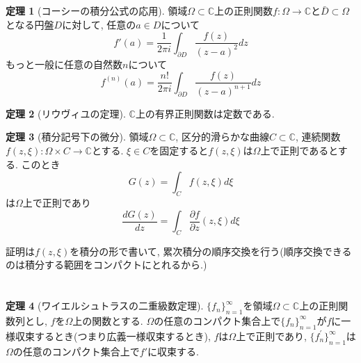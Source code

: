 \documentclass[dvipdfmx,a4paper,11pt]{article}
\newcommand{\C}{\mathbb{C}}
\theoremstyle{definition}
\newtheorem{thm}{定理}
\newcommand{\pdrv}[2]{\frac{\partial #1}{\partial #2}}
\newcommand{\drv}[2]{\frac{d #1}{d#2}}
\begin{document}
    \section{}

         \begin{tcolorbox}[
    colback = white,
    colframe = green!35!black,
    fonttitle = \bfseries,
    breakable = true]
    \begin{thm}[コーシーの積分公式の応用]
領域$\Omega \subset \C$上の正則関数$f : \Omega \rightarrow \C$と$\bar{D} \subset \Omega$となる円盤$D$に対して, 任意の$a \in D$について
$$
f'(a) = \frac{1}{2 \pi i} \int_{\partial D} \frac{f(z)}{(z - a)^2} dz
$$
もっと一般に任意の自然数$n$について
$$
f^{(n)}(a) = \frac{n !}{2 \pi i} \int_{\partial D} \frac{f(z)}{(z - a)^{n+1}} dz
$$
    \end{thm}
    \end{tcolorbox}
    
          \begin{tcolorbox}[
    colback = white,
    colframe = green!35!black,
    fonttitle = \bfseries,
    breakable = true]
    \begin{thm}[リウヴィユの定理]
$\C$上の有界正則関数は定数である. 
    \end{thm}
    \end{tcolorbox}

          \begin{tcolorbox}[
    colback = white,
    colframe = green!35!black,
    fonttitle = \bfseries,
    breakable = true]
    \begin{thm}[積分記号下の微分]
    領域$\Omega \subset \C$, 区分的滑らかな曲線$C\subset \C$, 
連続関数$f (z, \xi): \Omega \times C \rightarrow \C$とする.
$\xi \in C$を固定すると$f(z, \xi)$は$\Omega$上で正則であるとする.
このとき
$$
G(z) =  \int_{C} f(z, \xi)d\xi
$$
は$\Omega$上で正則であり
$$
\drv{G(z)}{z}= \int_{C} \pdrv{f}{z}(z, \xi)d\xi
$$
    \end{thm}
    \end{tcolorbox}
証明は$f(z,\xi)$を積分の形で書いて, 累次積分の順序交換を行う(順序交換できるのは積分する範囲をコンパクトにとれるから.)

\section{}

          \begin{tcolorbox}[
    colback = white,
    colframe = green!35!black,
    fonttitle = \bfseries,
    breakable = true]
    \begin{thm}[ワイエルシュトラスの二重級数定理]
$\{ f_{n}\}_{n=1}^{\infty}$を領域$\Omega \subset \C$上の正則関数列とし, $f$を$\Omega$上の関数とする.
$\Omega$の任意のコンパクト集合上で$\{ f_{n}\}_{n=1}^{\infty}$が$f$に一様収束するとき(つまり広義一様収束するとき), $f$は$\Omega$上で正則であり, $\{ f^{'}_{n}\}_{n=1}^{\infty}$は$\Omega$の任意のコンパクト集合上で$f'$に収束する. 
    \end{thm}
    \end{tcolorbox}
    
\end{document}
